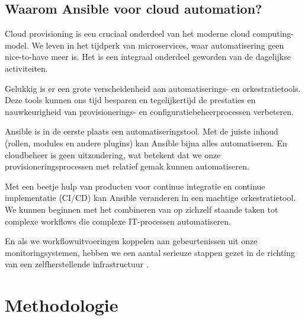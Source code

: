 \subsection{Waarom Ansible voor cloud automation?}
\label{Waarom Ansible voor cloud automation?}
Cloud provisioning is een cruciaal onderdeel van het moderne cloud computing-model. 
We leven in het tijdperk van microservices, waar automatisering geen nice-to-have meer is. 
Het is een integraal onderdeel geworden van de dagelijkse activiteiten.
\par
Gelukkig is er een grote verscheidenheid aan automatiserings- en orkestratietools. 
Deze tools kunnen ons tijd besparen en tegelijkertijd de prestaties en nauwkeurigheid van provisionerings- en 
configuratiebeheerprocessen verbeteren.
\par
Ansible is in de eerste plaats een automatiseringstool. Met de juiste inhoud (rollen, modules en andere plugins) kan Ansible bijna 
alles automatiseren. En cloudbeheer is geen uitzondering, wat betekent dat we onze provisioneringsprocessen met relatief gemak 
kunnen automatiseren.
\par
Met een beetje hulp van producten voor continue integratie en continue implementatie (CI/CD) kan Ansible veranderen in een 
machtige orkestratietool. We kunnen beginnen met het combineren van op zichzelf staande taken tot complexe workflows die 
complexe IT-processen automatiseren.
\par
En als we workflowuitvoeringen koppelen aan gebeurtenissen uit onze monitoringsystemen, 
hebben we een aantal serieuze stappen gezet in de richting van een zelfherstellende infrastructuur
\autocite{Borovšak2021}.



\section{Methodologie}%
\label{sec:methodologie}

